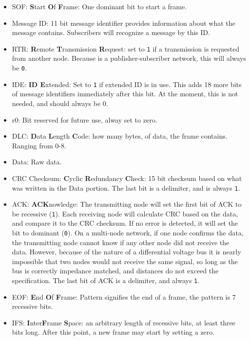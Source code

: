 
\begin{itemize}
	\item SOF: \textbf{S}tart \textbf{O}f \textbf{F}rame: One dominant bit to start a frame.
	\item Message ID: 11 bit message identifier provides information about what the message contains. Subscribers will recognize a message by this ID.
	\item RTR: \textbf{R}emote \textbf{T}ransmission \textbf{R}equest: set to \texttt{1} if a transmission is requested from another node. Because is a publisher-subscriber network, this will always be \texttt{0}.
	\item IDE: \textbf{ID E}xtended: Set to \texttt{1} if extended ID is in use. This adds 18 more bits of message identifiers immediately after this bit. At the moment, this is not needed, and should always be 0.
	\item r0: Bit reserved for future use, alway set to zero.
	\item DLC: \textbf{D}ata \textbf{L}ength \textbf{C}ode: how many bytes, of data, the frame contains. Ranging from 0-8.
	\item Data: Raw data. 
	\item CRC Checksum: \textbf{C}yclic \textbf{R}edundancy \textbf{C}heck: 15 bit checksum based on what was written in the Data portion. The last bit is a delimiter, and is always \texttt{1}.
	\item ACK: \textbf{ACK}nowledge: The transmitting node will set the first bit of ACK to be recessive (\texttt{1}). Each receiving node will calculate CRC based on the data, and compare it to the CRC checksum. If no error is detected, it will set the bit to dominant (\texttt{0}). On a multi-node network, if one node confirms the data, the transmitting node cannot know if any other node did not receive the data. However, because of the nature of a differential voltage bus it is nearly impossible that two nodes would not receive the same signal, so long as the bus is correctly impedance matched, and distances do not exceed the specification. The last bit of ACK is a delimiter, and always \texttt{1}.
	\item EOF: \textbf{E}nd \textbf{O}f \textbf{F}rame: Pattern signifies the end of a frame, the pattern is 7 recessive bits.
	\item IFS: \textbf{I}nter\textbf{F}rame \textbf{S}pace: an arbitrary length of recessive bits, at least three bits long. After this point, a new frame may start by setting a zero.
\end{itemize}

